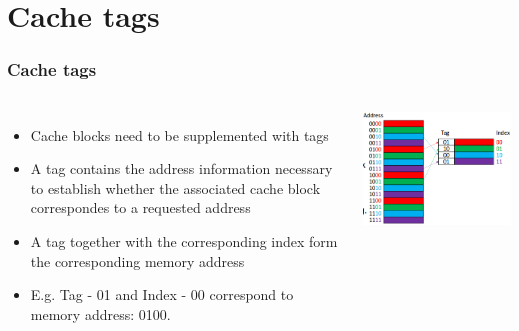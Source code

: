 \documentclass{beamer}
\begin{document}
\section{Cache tags}
\begin{frame}
\frametitle{Cache tags}
\begin{columns}[c]
\begin{itemize}
\item Cache blocks need to be supplemented with tags
\item A tag contains the address information necessary to establish whether the associated cache block correspondes to a requested address
\item A tag together with the corresponding index form the corresponding memory address
\item E.g. Tag - {\color{blue} 01} and Index - {\color{red} 00} correspond to memory address: {\color{blue}01}{\color{red}00}.
\end{itemize}
\includegraphics[scale=0.4]{tags.png}
\end{columns}
\end{frame}
\end{document}
